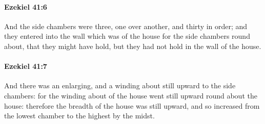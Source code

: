 		\paragraph{Ezekiel 41:6} %
			\label{EZEKIEL-41-6}

			And the side chambers were three, one over another, and thirty in order; and they entered into the wall which was of the house for the side chambers round about, that they might have hold, but they had not hold in the wall of the house.


		\paragraph{Ezekiel 41:7} %
			\label{EZEKIEL-41-7}

			And there was an enlarging, and a winding about still upward to the side chambers: for the winding about of the house went still upward round about the house: therefore the breadth of the house was still upward, and so increased from the lowest chamber to the highest by the midst.

